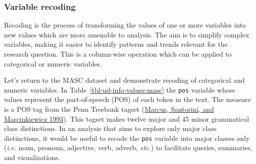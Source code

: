\documentclass[
  letterpaper,
  DIV=11,
  numbers=noendperiod]{scrreport}
\theoremstyle{definition}
\theoremstyle{remark}
\begin{document}
\hypertarget{sec-ud-variable-recoding}{%
\subsubsection{Variable recoding}\label{sec-ud-variable-recoding}}

Recoding is the process of transforming the values of one or more
variables into new values which are more amenable to analysis. The aim
is to simplify complex variables, making it easier to identify patterns
and trends relevant for the research question. This is a column-wise
operation which can be applied to categorical or numeric variables.

Let's return to the MASC dataset and demonstrate recoding of categorical
and numeric variables. In Table~\ref{tbl-ud-info-values-masc} the
\texttt{pos} variable whose values represent the part-of-speech (POS) of
each token in the text. The measure is a POS tag from the Penn Treebank
tagset (\protect\hyperlink{ref-Marcus1993}{Marcus, Santorini, and
Marcinkiewicz 1993}). This tagset makes twelve major and 45 minor
grammatical class distinctions. In an analysis that aims to explore only
major class distinctions, it would be useful to recode the \texttt{pos}
variable into major classes only (\emph{i.e.} noun, pronoun, adjective,
verb, adverb, \emph{etc.}) to facilitate queries, summaries, and
visualizations.
\end{document}
